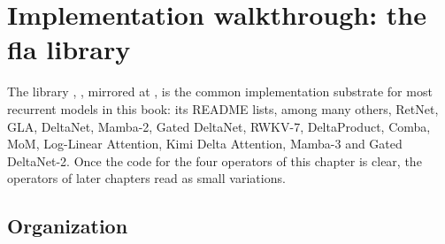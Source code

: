 \section{Implementation walkthrough: the fla library}\label{sec:c03-fla}
\begin{sloppypar}

The \fla{} library \citep{c03-yang2024fla}, , mirrored at
, is the common implementation substrate for most recurrent
models in this book: its README lists, among many others, RetNet, GLA, DeltaNet, Mamba-2, Gated
DeltaNet, RWKV-7, DeltaProduct, Comba, MoM, Log-Linear Attention, Kimi Delta Attention, Mamba-3
and Gated DeltaNet-2. Once the code for the four operators of this chapter is clear, the
operators of later chapters read as small variations.

\subsection{Organization}


\end{sloppypar}
